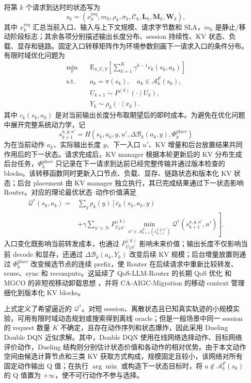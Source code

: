 将第 \(k\) 个请求到达时的状态写为
\[
s_k=
(x_k^{\mathrm{req}},m_k,\rho_k,\sigma_k,\mathcal C_k,
\mathbf L_k,\mathbf M_k,\mathbf W_k),
\]
其中 \(x_k^{\mathrm{req}}\) 汇总当前入口、输入与上下文规模、请求字节数和 SLA，\(m_k\) 是静止/移动阶段标志；其余各项分别描述输出长度分布、session 持续性、KV 状态、负载、显存和链路。固定入口转移矩阵作为环境参数刻画下一请求入口的条件分布。有限时域优化问题为
\[
\begin{array}{ll}
\displaystyle\min_{\pi}\quad&
\displaystyle
\mathrm E_{\pi,U,Y}
\left[\sum_{k=1}^{K}\gamma^{k-1}c_k(s_k,a_k)\right]\\
\mathrm{s.t.}\quad&
a_k=\pi(s_k),\quad a_k\in\mathcal A_k^F(s_k),\\
&U_{k+1}\sim P^{(k)}(\cdot\mid U_k),\\
&Y_k\sim\rho_k(\cdot\mid x_k).
\end{array}
\]
其中 \(c_k(s_k,a_k)\) 是对当前输出长度分布取期望后的即时成本。为避免在优化问题中展开完整系统动力学，记
\[
s_{k+1}^{a,y,u'}
=
H(s_k,a_k,y,u',\Delta\mathcal B_k(a_k,y),
\Phi_k^{\mathrm{place}})
\]
为在当前动作 \(a_k\)、实际输出长度 \(y\)、下一入口 \(u'\)、KV 增量和后台放置结果共同作用后的下一状态。请求完成后，KV manager 根据本轮更新后的 KV 分布生成后台任务，\(\Phi_k^{\mathrm{place}}\) 只记录在下一请求到达前已经完整传输并通过版本检查的 blocks。该转移函数同时更新入口节点、负载、显存、链路状态和版本化 KV 状态；后台 placement 由 KV manager 独立执行，其已完成结果通过下一状态影响 Router。对应的理论最优状态--动作价值满足
\[
\begin{array}{rl}
\mathcal Q^*(s_k,a_k)
={}&\displaystyle
\sum_y\rho_k(y)
\left[
\bar c_k(s_k,a_k,y)\right.\\
&\displaystyle\left.
+\gamma
\sum_{u'\in\mathcal N}
 P_{U_ku'}^{(k)}
\min_{a'\in\mathcal A_{k+1}^F(s_{k+1}^{a,y,u'})}
\mathcal Q^*(s_{k+1}^{a,y,u'},a')
\right].
\end{array}
\]
入口变化既影响当前转发成本，也通过 \(P_{U_ku'}^{(k)}\) 影响未来价值；输出长度不仅影响当前 decode 和显存，还通过 \(\Delta\mathcal B_k(a_k,Y_k)\) 改变后续 KV 规模；后台增量放置则通过 \(\Phi_k^{\mathrm{place}}\) 改变候选节点的连续 prefix，使 Router 在后续请求中重新比较转发、reuse、sync 和 recompute。这延续了 QoS-LLM-Router 的长期 QoS 优化 \cite{yang2025quality} 和 MGCO 的非短视移动卸载思想 \cite{ghosh2025mgco}，并将 CA-AIGC-Migration 的移动 context 管理 \cite{wang2026context} 细化到版本化 KV blocks。

上式定义了希望逼近的 \(\mathcal Q^*\)。对短 session、离散状态且已知真实轨迹的小规模实验，可用有限时域动态规划或搜索得到离线 oracle；但是一般场景中同一 session 的 request 数量 \(K\) 不确定，且存在动作序列和状态爆炸，因此采用 Dueling Double DQN 近似求解。其中，Double DQN 使用在线网络选择动作、目标网络评价动作，Dueling 结构则分别估计状态价值和各动作的相对优势。由于本文动作空间由候选计算节点和三类 KV 获取方式构成，规模固定且较小，该网络对所有固定动作输出 Q 值；在执行 \(\arg\min\) 或构造下一状态目标时，将 \(a\notin\mathcal A_k^F(s_k)\) 的 Q 值置为 \(+\infty\)，使不可行动作不参与选择。

